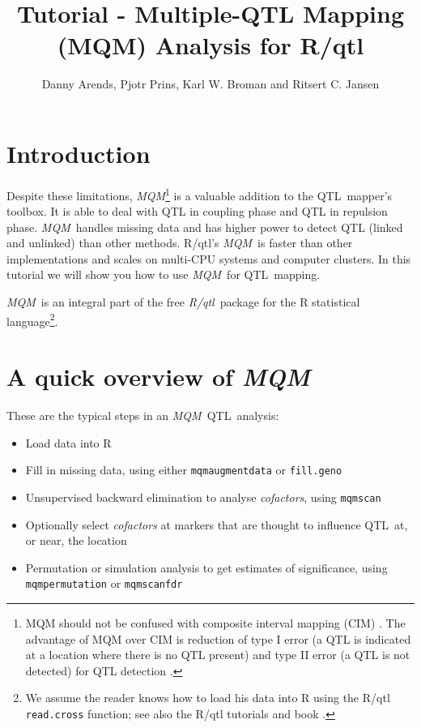\documentclass[11pt]{article}
\title { Tutorial - Multiple-QTL Mapping (MQM) Analysis for R/qtl }
\author { Danny Arends, Pjotr Prins, Karl W. Broman and Ritsert C. Jansen }
\newcommand{\mqm}{\emph{MQM}}
\newcommand{\qtl}{QTL}
\newcommand{\rqtl}{\emph{R/qtl}}
\newcommand{\code}{\texttt}
\begin{document}
\maketitle
\clearpage



\section{Introduction}



\vspace{0.3in}





Despite these limitations, \mqm\footnote{MQM should not be confused with
composite interval mapping (CIM) \cite{CIMa,CIMb}.  The advantage of MQM
over CIM is reduction of type I error (a QTL is indicated at a location where there
is no QTL present) and type II error (a QTL is not detected) for QTL detection
\cite{jansen94b}.} is a valuable addition to the \qtl\ mapper's toolbox. It
is able to deal with QTL in coupling phase and QTL in repulsion phase. \mqm\
handles missing data and has higher power to detect QTL (linked and unlinked)
than other methods.  R/qtl's \mqm\ is faster than other implementations and
scales on multi-CPU systems and computer clusters.  In this tutorial we will
show you how to use \mqm\ for \qtl\ mapping.

\mqm\ is an integral part of the free \rqtl\
package \cite{rqtlbook,broman09,broman03} for the R statistical
language\footnote{We assume the reader knows how to load his data into R using
the R/qtl \code{read.cross} function; see also the R/qtl tutorials \cite{broman09}
and book \cite{rqtlbook}.}.

\section{A quick overview of \mqm}

These are the typical steps in an \mqm\ \qtl\ analysis:

\begin{itemize}
\item Load data into R
\item Fill in missing data, using either \code{mqmaugmentdata} or \code{fill.geno}
\item Unsupervised backward elimination to analyse \emph{cofactors}, using \code{mqmscan}
\item Optionally select \emph{cofactors\/} at markers that are thought to influence \qtl\ at, or near, the location
\item Permutation or simulation analysis to get estimates of significance, using \code{mqmpermutation} or \code{mqmscanfdr}
\end{itemize}
\end{document}
